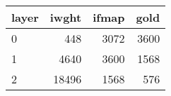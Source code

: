 \begin{tabular}{lrrr}
\toprule
layer &  iwght &  ifmap &  gold \\
\midrule
    0 &    448 &   3072 &  3600 \\
    1 &   4640 &   3600 &  1568 \\
    2 &  18496 &   1568 &   576 \\
\bottomrule
\end{tabular}
